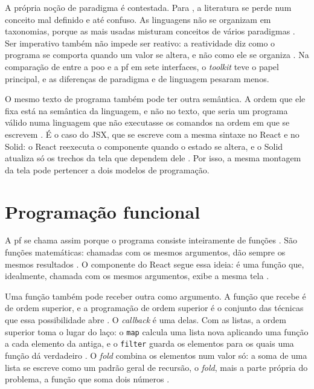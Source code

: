 A própria noção de paradigma é contestada.
Para \textcite[p. 1]{krishnamurthi2019}, a literatura se perde num
conceito mal definido e até confuso.
As linguagens não se organizam em taxonomias, porque as mais usadas
misturam conceitos de vários paradigmas \cite[p. 7]{krishnamurthi2019}.
Ser imperativo também não impede ser reativo: a reatividade diz como o programa se comporta quando um valor se
altera, e não como ele se organiza \cite[p. 7]{krishnamurthi2019}.
Na comparação de \textcite[p. 23 e 56]{kiss2014} entre a \gls{poo} e
a \gls{pf} em sete interfaces, o \emph{toolkit} teve o papel principal, e as
diferenças de paradigma e de linguagem pesaram menos.

O mesmo texto de programa também pode ter outra semântica.
A ordem que ele fixa está na semântica da linguagem, e não no texto, que
seria um
programa válido numa linguagem que não executasse os comandos na ordem
em que se escrevem \cite[p. 9]{moseley2006}.
É o caso do JSX, que se escreve com a mesma sintaxe no React e no Solid: o
React reexecuta o componente quando o estado se altera, e o Solid
atualiza só os trechos da tela que dependem dele
\cites[][ p. 289:38]{lee2025}{solidjs2026}.
Por isso, a mesma montagem da tela pode pertencer a dois modelos de
programação.
\section{Programação funcional}
\label{sec:programacao-funcional}

A \gls{pf} se chama assim porque o programa consiste inteiramente de
funções \cite[p. 1]{hughes1990}.
São funções matemáticas: chamadas com os mesmos argumentos, dão sempre os
mesmos resultados \cite[p. 26]{vanroy2009}.
O componente do React segue essa ideia: é uma função que, idealmente,
chamada com os mesmos argumentos, exibe a mesma tela
\cite[p. 289:1]{lee2025}.

Uma função também pode receber outra como argumento.
A função que recebe é de ordem superior, e a programação de ordem
superior é o conjunto das técnicas que essa possibilidade abre
\cite[p. 177]{vanroy2004}.
O \emph{callback} é uma delas.
Com as listas, a ordem superior toma o lugar do laço: o \texttt{map} calcula uma
lista nova aplicando uma função a cada elemento da antiga, e o \texttt{filter}
guarda os elementos para os quais uma função dá verdadeiro
\cite[p. 190-191]{vanroy2004}.
O \emph{fold} combina os elementos num valor só: a soma de uma lista se escreve
como um padrão geral de recursão, o \emph{fold}, mais a parte própria do
problema, a função que soma dois números \cite[p. 5]{hughes1990}.

